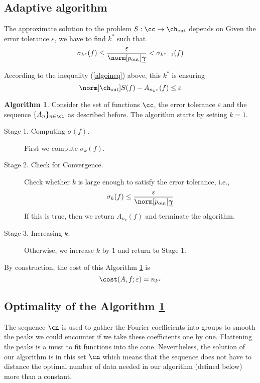\documentclass[final]{elsarticle}
\newcommand{\chout}{\ch_{\text{\rm{out}}}}
\newcommand{\pout}{p_{\text{\rm{out}}}}
\newcommand{\bgamma}{\underline{\boldsymbol\gamma}}
\theoremstyle{definition}
\newtheorem{algo}{Algorithm}
\theoremstyle{remark}
\begin{document}
\subsection{Adaptive algorithm}

The approximate solution to the problem $S:\cc\rightarrow\chout$ depends on
Given the error tolerance $\varepsilon$, we have to find $k^*$ such that
\begin{equation*}
         \sigma_{k^*}(f) \le \frac{\varepsilon}{\norm[\pout]{\bgamma}} < \sigma_{k^*-1}(f)
\end{equation*}

According to the inequality (\ref{algoineq}) above, this $k^*$ is ensuring
\begin{equation*}
\norm[\chout]{S(f)-A_{n_{k^*}}(f)} \le \varepsilon
\end{equation*}

\begin{algo}\label{algo2}
 Consider the set of functions $\cc$, the error tolerance $\varepsilon$ and the sequence $\{A_n\}_{n \in \ci}$ as described before.
The algorithm starts by setting $k=1$.
\begin{description}
\item[Stage 1. Computing $\sigma(f)$.] First we compute $\sigma_{k}(f)$.
\item[Stage 2. Check for Convergence.] Check whether $k$ is large enough to satisfy the error tolerance, i.e.,
    \begin{equation}
          \sigma_{k}(f) \le \frac{\varepsilon}{\norm[\pout]{\bgamma}}
    \end{equation}
    If this is true, then we return $A_{n_{k}}(f)$ and terminate the algorithm.
\item[Stage 3. Increasing $k$.] Otherwise, we increase $k$ by $1$ and return to Stage $1$.
\end{description}
\end{algo}

 By construction, the cost of this Algorithm \ref{algo2} is
\begin{equation}\label{costalgo}
\cost(A,f;\varepsilon)=n_{k^*}
\end{equation}

\subsection{Optimality of the Algorithm \ref{algo2}}

The sequence $\cn$ is used to gather the Fourier coefficients into groups to smooth the peaks we could encounter if we take these coefficients one by one. Flattening the peaks is a must to fit functions into the cone. Nevertheless, the solution of our algorithm is in this set $\cn$ which means that the sequence does not have to distance the optimal number of data needed in our algorithm (defined below) more than a constant.
\end{document}
